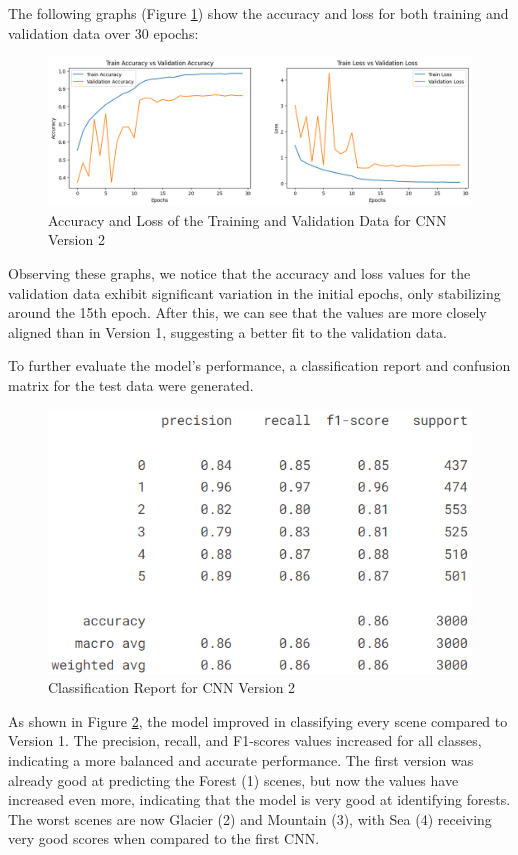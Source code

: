 \documentclass[conference]{IEEEtran}
\begin{document}
The following graphs (Figure \ref{fig:accuracyLossCNN2}) show the accuracy and loss for both training and validation data over 30 epochs:

\begin{figure}[H]
    \centering
    \includegraphics[width=1\linewidth]
    {images/acc_loss_cnn_2.png}
    \caption{Accuracy and Loss of the Training and Validation Data for CNN Version 2}
    \label{fig:accuracyLossCNN2}
\end{figure}

Observing these graphs, we notice that the accuracy and loss values for the validation data exhibit significant variation in the initial epochs, only stabilizing around the 15th epoch. After this, we can see that the values are more closely aligned than in Version 1, suggesting a better fit to the validation data.

To further evaluate the model's performance, a classification report and confusion matrix for the test data were generated.

\begin{figure}[H]
    \centering
    \includegraphics[width=0.8\linewidth]{images/cnn_class_report_2.png}
    \caption{Classification Report for CNN Version 2}
    \label{fig:classReportCNN2}
\end{figure}

As shown in Figure \ref{fig:classReportCNN2}, the model improved in classifying every scene compared to Version 1. The precision, recall, and F1-scores values increased for all classes, indicating a more balanced and accurate performance. The first version was already good at predicting the Forest (1) scenes, but now the values have increased even more, indicating that the model is very good at identifying forests. The worst scenes are now Glacier (2) and Mountain (3), with Sea (4) receiving very good scores when compared to the first CNN.
\end{document}

